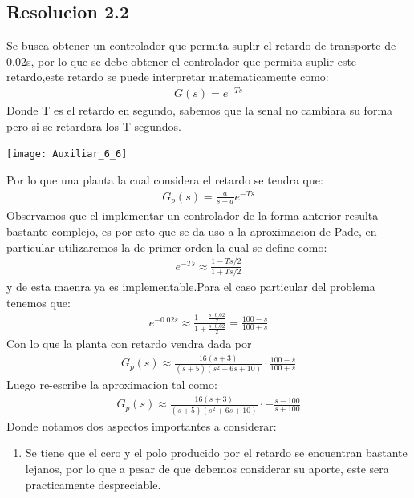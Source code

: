 \documentclass[
  11pt,
  letterpaper,
   addpoints,
   answers
  ]{exam}
\begin{document}
\begin{questions}
\begin{solution}
\subsection*{Resolucion 2.2}
Se busca obtener un controlador que permita suplir el retardo de transporte de 0.02s, por lo que se debe obtener el controlador que permita suplir este retardo,este retardo se puede interpretar matematicamente como:
\begin{align}
    G(s) = e^{-Ts}
\end{align}
Donde T es el retardo en segundo, sabemos que la senal no cambiara su forma pero si se retardara los T segundos.
\begin{center}
    \texttt{[image: Auxiliar\_6\_6]}
\end{center}
Por lo que una planta la cual considera el retardo se tendra que:
\begin{align}
    G_{p}(s)= \frac{a}{s+a} e^{-Ts}
\end{align}
Observamos que el implementar un controlador de la forma anterior resulta bastante complejo, es por esto que se da uso a la aproximacion de Pade, en particular utilizaremos la de primer orden la cual se define como:
\begin{align}
    e^{-Ts} \approx \frac{1-Ts/2}{1+Ts/2}
\end{align}
y de esta maenra ya es implementable.Para el caso particular del problema tenemos que:
\begin{align}
    e^{-0.02s} \approx \frac{1 - \frac{s \cdot 0.02}{2}}{1 + \frac{s \cdot 0.02}{2}} = \frac{100 - s}{100 + s}
\end{align}
Con lo que la planta con retardo vendra dada por
\begin{align}
    G_{p}(s) \approx \frac{16(s+3)}{(s+5)(s^{2}+6s+10)}\cdot \frac{100-s}{100+s}
\end{align}
Luego re-escribe la aproximacion tal como:
\begin{align}
    G_{p}(s) \approx \frac{16(s+3)}{(s+5)(s^{2}+6s+10)}\cdot -\frac{s-100}{s+100}
\end{align}
Donde notamos dos aspectos importantes a considerar:
\begin{enumerate}
    \item Se tiene que el cero y el polo producido por el retardo se encuentran bastante lejanos, por lo que a pesar de que debemos considerar su aporte, este sera practicamente despreciable.

\end{enumerate}
\end{solution}
\end{questions}
\end{document}
